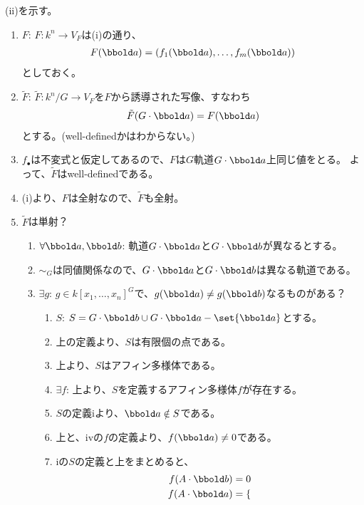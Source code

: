 \begin{myproof}
  (ii)を示す。
  \begin{enumerate}
    \item $F$:
    $F\colon k^n \to V_F$は(i)の通り、
    \begin{align}
      F(\bbold a) = (f_1(\bbold a),\dots,f_m(\bbold a))
    \end{align}
    としておく。
    \item
    $\tilde F$: $\tilde F\colon k^n/G \to V_F$を$F$から誘導された写像、すなわち
    \begin{align}
      \tilde F(G\cdot \bbold a) = F(\bbold a)
    \end{align}
    とする。(well-definedかはわからない。)
    \item
    $f_\bullet$は不変式と仮定してあるので、$F$は$G$軌道$G\cdot \bbold a$上同じ値をとる。
    よって、$\tilde F$はwell-definedである。
    \item
    (i)より、$F$は全射なので、$\tilde F$も全射。
    \item
    $\tilde F$は単射？
    \begin{enumerate}
      \item $\forall \bbold a,\bbold b$: 軌道$G\cdot \bbold a$と$G\cdot \bbold b$が異なるとする。
      \item
      $\sim_G$は同値関係なので、$G\cdot \bbold a$と$G\cdot \bbold b$は異なる軌道である。
      \item $\exists g$: $g\in k[x_1,\dots,x_n]^G$で、$g(\bbold a)\neq g(\bbold b)$なるものがある？
      \begin{enumerate}
        \item
        $S$: $S=G\cdot \bbold b \cup G\cdot \bbold a - \set{\bbold a}$とする。
        \item
        上の定義より、$S$は有限個の点である。
        \item
        上より、$S$はアフィン多様体である。
        \item
        $\exists f$:
        上より、$S$を定義するアフィン多様体$f$が存在する。
        \item
        $S$の定義iより、$\bbold a\notin S$である。
        \item
        上と、ivの$f$の定義より、$f(\bbold a)\neq 0$である。
        \item
        iの$S$の定義と上をまとめると、
        \begin{align}
          f(A\cdot \bbold b) &= 0 \\
          f(A\cdot \bbold a) &=
          \begin{cases}

\end{cases}
\end{align}
\end{enumerate}
\end{enumerate}
\end{enumerate}
\end{myproof}
